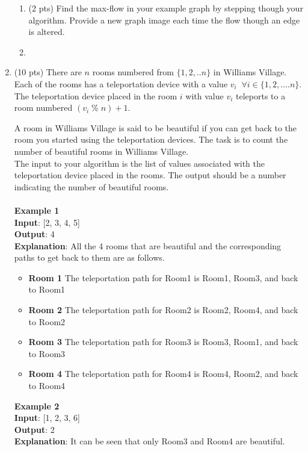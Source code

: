 \documentclass[12pt]{article}
\newcommand{\makenonemptybox}[2]{%
\item[]
\fbox{%
\parbox[c][#1][t]{\dimexpr\linewidth-2\fboxsep-2\fboxrule}{
  \hrule width \hsize height 0pt
  #2
 }%
}%
\par\vspace{\ht\strutbox}
}
\begin{document}
\begin{enumerate}
{\begin{enumerate}
	        \item (2 pts) Find the max-flow in your example graph by stepping though your algorithm. Provide a new graph image each time the flow though an edge is altered. 
	        \makenonemptybox{3in}{}
	        
	    \end{enumerate}
	}
	
	\clearpage
	\item{
	    
	    (10 pts) There are $n$ rooms numbered from $\{1, 2, .. n\}$ in  Williams Village. Each of the rooms has a teleportation device with a value $v_i \; \; \forall i \in \{1, 2, ....n\}$. The teleportation device placed in the room $i$ with value $v_i$ teleports to a room numbered  $(v_i \; \% \; n) + 1$. 
	    
	    A room in Williams Village is said to be beautiful if you can get back to the room you started using the teleportation devices. The task is to count the number of beautiful rooms in Williams Village. \\
	    The input to your algorithm is the list of values associated with the teleportation device placed in the rooms. The output should be a number indicating the number of beautiful rooms. \\ \\
	    
	    \textbf{Example 1}\\
	    \textbf{Input}: [2, 3, 4, 5] \\
	    \textbf{Output}: 4\\
	    \textbf{Explanation}: All the 4 rooms that are beautiful and the corresponding paths  to get back to them are as follows.\\
	    \begin{itemize}
	        \item \textbf{Room 1} The teleportation path for Room1 is Room1, Room3, and back to Room1
	        \item \textbf{Room 2} The teleportation path for Room2 is Room2, Room4, and back to Room2
	        \item \textbf{Room 3} The teleportation path for Room3 is Room3, Room1, and back to Room3
	        \item \textbf{Room 4} The teleportation path for Room4 is Room4, Room2, and back to Room4
	    \end{itemize}
	    
	    \textbf{Example 2}\\
	    \textbf{Input}: [1, 2, 3, 6] \\
	    \textbf{Output}: 2\\
	    \textbf{Explanation}: It can be seen that only Room3 and Room4 are beautiful.
	    
}
\end{enumerate}
\end{document}
